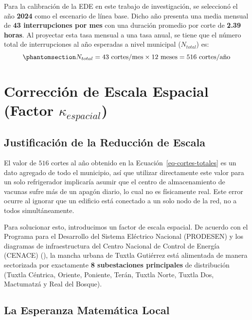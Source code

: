\documentclass[
  spanish,
  us-letterpaper,
]{scrreprt}
\numberwithin{equation}{section}
\theoremstyle{plain}
\theoremstyle{plain}
\theoremstyle{definition}
\theoremstyle{plain}
\theoremstyle{remark}
\begin{document}
Para la calibración de la EDE en este trabajo de investigación, se
seleccionó el año \textbf{2024} como el escenario de línea base. Dicho
año presenta una media mensual de \textbf{43 interrupciones por mes} con
una duración promedio por corte de \textbf{2.39 horas}. Al proyectar
esta tasa mensual a una tasa anual, se tiene que el número total de
interrupciones al año esperadas a nivel municipal (\(N_{total}\)) es:
\begin{equation}\phantomsection\label{eq-cortes-totales}{
N_{total} = 43 \text{ cortes/mes} \times 12 \text{ meses} = 516 \text{ cortes/año}
}\end{equation}

\section{\texorpdfstring{Corrección de Escala Espacial (Factor
\(\kappa_{espacial}\))}{Corrección de Escala Espacial (Factor \textbackslash kappa\_\{espacial\})}}\label{sec-escala-espacial}

\subsection{Justificación de la Reducción de
Escala}\label{justificaciuxf3n-de-la-reducciuxf3n-de-escala}

El valor de \(516\) cortes al año obtenido en la
Ecuación~\ref{eq-cortes-totales} es un dato agregado de todo el
municipio, así que utilizar directamente este valor para un solo
refrigerador implicaría asumir que el centro de almacenamiento de
vacunas sufre más de un apagón diario, lo cual no es físicamente real.
Este error ocurre al ignorar que un edificio está conectado a un solo
nodo de la red, no a todos simultáneamente.

Para solucionar esto, introducimos un factor de escala espacial. De
acuerdo con el Programa para el Desarrollo del Sistema Eléctrico
Nacional (PRODESEN) y los diagramas de infraestructura del Centro
Nacional de Control de Energía (CENACE)
(), la
mancha urbana de Tuxtla Gutiérrez está alimentada de manera sectorizada
por exactamente \textbf{8 subestaciones principales} de distribución
(Tuxtla Céntrica, Oriente, Poniente, Terán, Tuxtla Norte, Tuxtla Dos,
Mactumatzá y Real del Bosque).

\subsection{La Esperanza Matemática
Local}\label{la-esperanza-matemuxe1tica-local}
\end{document}
